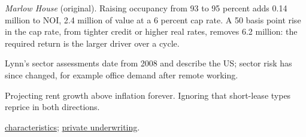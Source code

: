\begin{qfmethod}
 \emph{Marlow House} (original). Raising occupancy from 93 to 95 percent adds 0.14 million to NOI, 2.4 million of value at a 6 percent cap rate. A 50 basis point rise in the cap rate, from tighter credit or higher real rates, removes 6.2 million: the required return is the larger driver over a cycle.

 Lynn's sector assessments date from 2008 and describe the US; sector risk has since changed, for example office demand after remote working.

 Projecting rent growth above inflation forever. Ignoring that short-lease types reprice in both directions.

 \hyperref[def:real-estate-characteristics]{characteristics}; \hyperref[meth:private-real-estate-underwriting]{private underwriting}.

\end{qfmethod}


